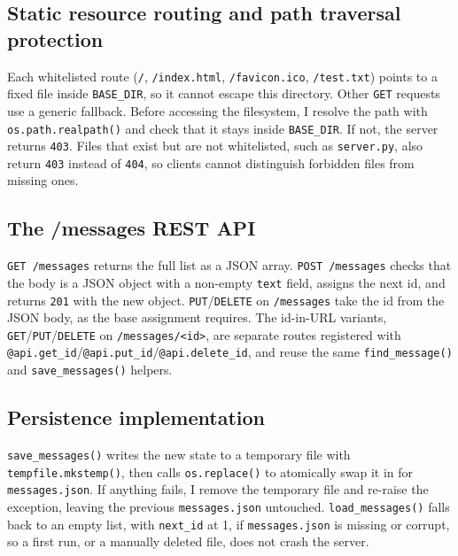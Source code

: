 \documentclass[conference]{IEEEtran}
\begin{document}
\subsection{Static resource routing and path traversal protection}\label{Subsection:impl_traversal}
Each whitelisted route (\texttt{/}, \texttt{/index.html},
\texttt{/favicon.ico}, \texttt{/test.txt}) points to a fixed file inside
\texttt{BASE\_DIR}, so it cannot escape this directory. Other \texttt{GET}
requests use a generic fallback. Before accessing the filesystem, I resolve
the path with \texttt{os.path.realpath()} and check that it stays inside
\texttt{BASE\_DIR}. If not, the server returns \texttt{403}. Files that
exist but are not whitelisted, such as \texttt{server.py}, also return
\texttt{403} instead of \texttt{404}, so clients cannot distinguish
forbidden files from missing ones.


\subsection{The /messages REST API}\label{Subsection:impl_messages}
\texttt{GET /messages} returns the full list as a JSON array.
\texttt{POST /messages} checks that the body is a JSON object with a
non-empty \texttt{text} field, assigns the next id, and returns
\texttt{201} with the new object. \texttt{PUT}/\texttt{DELETE} on
\texttt{/messages} take the id from the JSON body, as the base assignment
requires. The id-in-URL variants, \texttt{GET}/\texttt{PUT}/\texttt{DELETE}
on \texttt{/messages/<id>}, are separate routes registered with
\texttt{@api.get\_id}/\texttt{@api.put\_id}/\texttt{@api.delete\_id}, and
reuse the same \texttt{find\_message()} and \texttt{save\_messages()}
helpers.

\subsection{Persistence implementation}\label{Subsection:impl_persistence}
\texttt{save\_messages()} writes the new state to a temporary file with
\texttt{tempfile.mkstemp()}, then calls \texttt{os.replace()} to
atomically swap it in for \texttt{messages.json}. If anything fails, I
remove the temporary file and re-raise the exception, leaving the previous
\texttt{messages.json} untouched. \texttt{load\_messages()} falls back to
an empty list, with \texttt{next\_id} at 1, if \texttt{messages.json} is
missing or corrupt, so a first run, or a manually deleted file, does not
crash the server.
\end{document}
